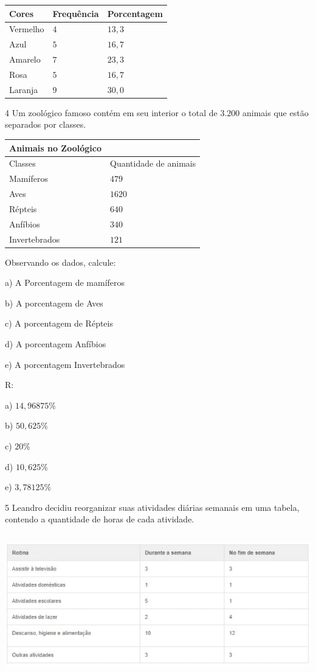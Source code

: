 
\begin{longtable}[]{@{}lll@{}}
\toprule
Cores & Frequência & Porcentagem\tabularnewline
\midrule
\endhead
Vermelho & $4$ & $13,3$\tabularnewline
Azul & $5$ & $16,7$\tabularnewline
Amarelo & $7$ & $23,3$\tabularnewline
Rosa & $5$ & $16,7$\tabularnewline
Laranja & $9$ & $30,0$\tabularnewline
\bottomrule
\end{longtable}

\num{4}  Um zoológico famoso contém em seu interior o total de $3.200$ animais
que estão separados por classes.


\begin{longtable}[]{@{}ll@{}}
\toprule
Animais no Zoológico &\tabularnewline
\midrule
\endhead
Classes & Quantidade de animais\tabularnewline
Mamíferos & $479$\tabularnewline
Aves & $1620$\tabularnewline
Répteis & $640$\tabularnewline
Anfíbios & $340$\tabularnewline
Invertebrados & $121$\tabularnewline
\bottomrule
\end{longtable}

Observando os dados, calcule:

a) A Porcentagem de mamíferos

b) A porcentagem de Aves

c) A porcentagem de Répteis

d) A porcentagem Anfíbios

e) A porcentagem Invertebrados

R:

a) $14,96875\%$

b) $50,625\%$

c) $20\%$

d) $10,625\%$

e) $3,78125\%$

\num{5}  Leandro decidiu reorganizar suas atividades diárias semanais em uma
tabela, contendo a quantidade de horas de cada atividade.

\includegraphics[width=5.90556in,height=2.41638in]{./imgSAEB_6_MAT/media/image83.png}

